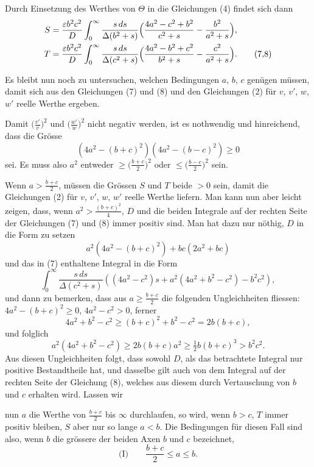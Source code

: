 \documentclass[12pt,a4paper]{book}
\theoremstyle{definition}
\theoremstyle{remark}
\begin{document}
Durch Einsetzung des Werthes von $\Theta$ in die Gleichungen (4) findet sich dann
\begin{align*}
S &= \frac{\varepsilon b^{2}c^{2}}{D}\int_{0}^{\infty}\frac{s\,ds}{\Delta(b^{2} + s)}\Bigl(\frac{4a^{2} - c^{2} + b^{2}}{c^{2} + s} - \frac{b^{2}}{a^{2} + s}\Bigr),\\
T &= \frac{\varepsilon b^{2}c^{2}}{D}\int_{0}^{\infty}\frac{s\,ds}{\Delta(c^{2} + s)}\Bigl(\frac{4a^{2} - b^{2} + c^{2}}{b^{2} + s} - \frac{c^{2}}{a^{2} + s}\Bigr).\tag{7,8}
\end{align*}

Es bleibt nun noch zu untersuchen, welchen Bedingungen $a$, $b$, $c$ gen\"ugen m\"ussen, damit sich aus den Gleichungen (7) und (8) und den Gleichungen (2) f\"ur $v$, $v'$, $w$, $w'$ reelle Werthe ergeben.

Damit $\bigl(\frac{v'}{v}\bigr)^{2}$ und $\bigl(\frac{w'}{w}\bigr)^{2}$ nicht negativ werden, ist es nothwendig und hinreichend, dass die Gr\"osse
\[
(4a^{2} - (b + c)^{2})(4a^{2} - (b - c)^{2}) \geq 0
\]
sei. Es muss also $a^{2}$ entweder $\geq \bigl(\frac{b+c}{2}\bigr)^{2}$ oder $\leq \bigl(\frac{b-c}{2}\bigr)^{2}$ sein.

Wenn $a > \frac{b+c}{2}$, m\"ussen die Gr\"ossen $S$ und $T$ beide $> 0$ sein, damit die Gleichungen (2) f\"ur $v$, $v'$, $w$, $w'$ reelle Werthe liefern. Man kann nun aber leicht zeigen, dass, wenn $a^{2} > \frac{(b+c)^{2}}{4}$, $D$ und die beiden Integrale auf der rechten Seite der Gleichungen (7) und (8) immer positiv sind. Man hat dazu nur n\"othig, $D$ in die Form zu setzen
\[
a^{2}(4a^{2} - (b + c)^{2}) + bc(2a^{2} + bc)
\]
und das in (7) enthaltene Integral in die Form
\[
\int_{0}^{\infty}\frac{s\,ds}{\Delta(c^{2} + s)}((4a^{2} - c^{2})s + a^{2}(4a^{2} + b^{2} - c^{2}) - b^{2}c^{2}),
\]
und dann zu bemerken, dass aus $a \geq \frac{b+c}{2}$ die folgenden Ungleichheiten fliessen: $4a^{2} - (b+c)^{2} \geq 0$, $4a^{2} - c^{2} > 0$, ferner
\[
4a^{2} + b^{2} - c^{2} \geq (b+c)^{2} + b^{2} - c^{2} = 2b(b+c),
\]
und folglich
\[
a^{2}(4a^{2} + b^{2} - c^{2}) \geq 2b(b+c)a^{2} \geq \tfrac{1}{2}b(b+c)^{3} > b^{2}c^{2}.
\]
Aus diesen Ungleichheiten folgt, dass sowohl $D$, als das betrachtete Integral nur positive Bestandtheile hat, und dasselbe gilt auch von dem Integral auf der rechten Seite der Gleichung (8), welches aus diesem durch Vertauschung von $b$ und $c$ erhalten wird. Lassen wir

nun $a$ die Werthe von $\frac{b+c}{2}$ bis $\infty$ durchlaufen, so wird, wenn $b > c$, $T$ immer positiv bleiben, $S$ aber nur so lange $a < b$. Die Bedingungen f\"ur diesen Fall sind also, wenn $b$ die gr\"ossere der beiden Axen $b$ und $c$ bezeichnet,
\[
\text{(I)}\qquad \frac{b+c}{2} \leq a \leq b.
\]
\end{document}

